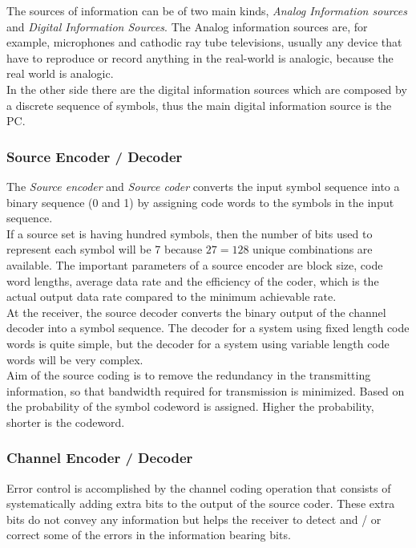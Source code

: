 The sources of information can be of two main kinds, \emph{Analog Information
sources} and \emph{Digital Information Sources}. The Analog information sources
are, for example, microphones and cathodic ray tube televisions, usually any
device that have to reproduce or record anything in the real-world is analogic,
because the real world is analogic. \\

In the other side there are the digital information sources which are composed
by a discrete sequence of symbols, thus the main digital information source is
the PC.

\subsubsection{Source Encoder / Decoder}

The \emph{Source encoder}  and \emph{Source coder} converts the input symbol
sequence into a binary sequence (0 and 1) by assigning code words to the symbols
in the input sequence.\\

If a source set is having hundred symbols, then the number of bits used to
represent each symbol will be 7 because $27=128$ unique combinations are
available. The important parameters of a source encoder are block size, code
word lengths, average data rate and the efficiency of the coder, which is the
actual output data rate compared to the minimum achievable rate.\\

At the receiver, the source decoder converts the binary output of the channel
decoder into a symbol sequence. The decoder for a system using fixed length code
words is quite simple, but the decoder for a system using variable length code
words will be very complex.\\

Aim of the source coding is to remove the redundancy in the transmitting
information, so that bandwidth required for transmission is minimized. Based on
the probability of the symbol codeword is assigned. Higher the probability,
shorter is the codeword.

\subsubsection{Channel Encoder / Decoder}

Error control is accomplished by the channel coding operation that consists of
systematically adding extra bits to the output of the source coder. These extra
bits do not convey any information but helps the receiver to detect and / or
correct some of the errors in the information bearing bits.\\


